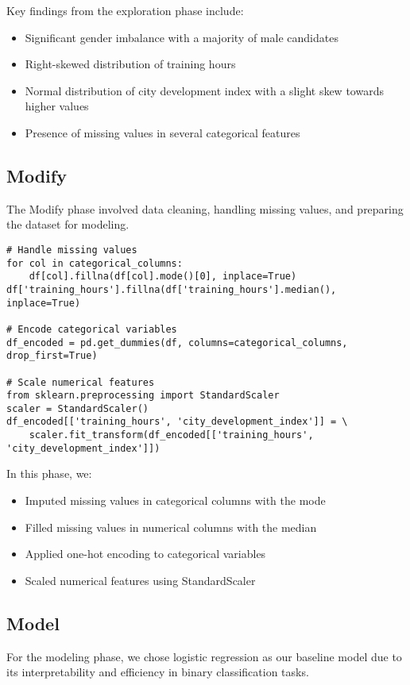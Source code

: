 \documentclass[12pt]{article}
\begin{document}
Key findings from the exploration phase include:
\begin{itemize}
    \item Significant gender imbalance with a majority of male candidates
    \item Right-skewed distribution of training hours
    \item Normal distribution of city development index with a slight skew towards higher values
    \item Presence of missing values in several categorical features
\end{itemize}

\subsection{Modify}
The Modify phase involved data cleaning, handling missing values, and preparing the dataset for modeling.

\begin{verbatim}
# Handle missing values
for col in categorical_columns:
    df[col].fillna(df[col].mode()[0], inplace=True)
df['training_hours'].fillna(df['training_hours'].median(), inplace=True)

# Encode categorical variables
df_encoded = pd.get_dummies(df, columns=categorical_columns, drop_first=True)

# Scale numerical features
from sklearn.preprocessing import StandardScaler
scaler = StandardScaler()
df_encoded[['training_hours', 'city_development_index']] = \
    scaler.fit_transform(df_encoded[['training_hours', 'city_development_index']])
\end{verbatim}

In this phase, we:
\begin{itemize}
    \item Imputed missing values in categorical columns with the mode
    \item Filled missing values in numerical columns with the median
    \item Applied one-hot encoding to categorical variables
    \item Scaled numerical features using StandardScaler
\end{itemize}

\subsection{Model}
For the modeling phase, we chose logistic regression as our baseline model due to its interpretability and efficiency in binary classification tasks.
\end{document}
